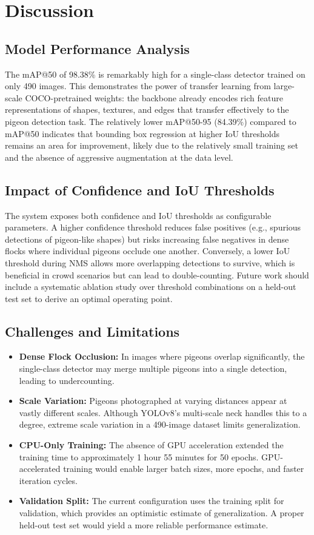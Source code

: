 \documentclass[journal]{IEEEtran}
\begin{document}
\section{Discussion}
\label{sec:discussion}

\subsection{Model Performance Analysis}
The mAP@50 of 98.38\% is remarkably high for a single-class detector trained on only 490 images. This demonstrates the power of transfer learning from large-scale COCO-pretrained weights: the backbone already encodes rich feature representations of shapes, textures, and edges that transfer effectively to the pigeon detection task. The relatively lower mAP@50-95 (84.39\%) compared to mAP@50 indicates that bounding box regression at higher IoU thresholds remains an area for improvement, likely due to the relatively small training set and the absence of aggressive augmentation at the data level.

\subsection{Impact of Confidence and IoU Thresholds}
The system exposes both confidence and IoU thresholds as configurable parameters. A higher confidence threshold reduces false positives (e.g., spurious detections of pigeon-like shapes) but risks increasing false negatives in dense flocks where individual pigeons occlude one another. Conversely, a lower IoU threshold during NMS allows more overlapping detections to survive, which is beneficial in crowd scenarios but can lead to double-counting. Future work should include a systematic ablation study over threshold combinations on a held-out test set to derive an optimal operating point.

\subsection{Challenges and Limitations}
\begin{itemize}
  \item \textbf{Dense Flock Occlusion:} In images where pigeons overlap significantly, the single-class detector may merge multiple pigeons into a single detection, leading to undercounting.
  \item \textbf{Scale Variation:} Pigeons photographed at varying distances appear at vastly different scales. Although YOLOv8's multi-scale neck handles this to a degree, extreme scale variation in a 490-image dataset limits generalization.
  \item \textbf{CPU-Only Training:} The absence of GPU acceleration extended the training time to approximately 1 hour 55 minutes for 50 epochs. GPU-accelerated training would enable larger batch sizes, more epochs, and faster iteration cycles.
  \item \textbf{Validation Split:} The current configuration uses the training split for validation, which provides an optimistic estimate of generalization. A proper held-out test set would yield a more reliable performance estimate.
\end{itemize}
\end{document}
